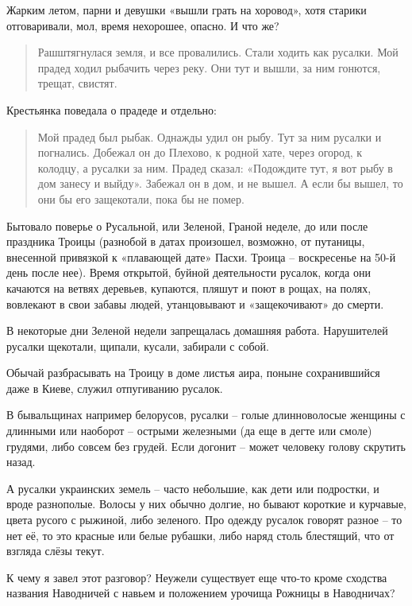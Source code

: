 Жарким летом, парни и девушки «вышли грать на хоровод», хотя старики отговаривали, мол, время нехорошее, опасно. И что же? 

\begin{quotation} 
Рашштягнулася земля, и все провалились. Стали ходить как русалки. Мой прадед ходил рыбачить через реку. Они тут и вышли, за ним гонются, трещат, свистят.
\end{quotation} 

Крестьянка поведала о прадеде и отдельно:

\begin{quotation} 
Мой прадед был рыбак. Однажды удил он рыбу. Тут за ним русалки и погнались. Добежал он до Плехово, к родной хате, через огород, к колодцу, а русалки за ним. Прадед сказал: «Подождите тут, я вот рыбу в дом занесу и выйду». Забежал он в дом, и не вышел. А если бы вышел, то они бы его защекотали, пока бы не помер.
\end{quotation} 

Бытовало поверье о Русальной, или Зеленой, Граной неделе, до или после праздника Троицы (разнобой в датах произошел, возможно, от путаницы, внесенной привязкой к «плавающей дате» Пасхи. Троица – воскресенье на 50-й день после нее). Время открытой, буйной деятельности русалок, когда они качаются на ветвях деревьев, купаются, пляшут и поют в рощах, на полях, вовлекают в свои забавы людей, утанцовывают и «защекочивают» до смерти.

В некоторые дни Зеленой недели запрещалась домашняя работа. Нарушителей русалки щекотали, щипали, кусали, забирали с собой.

Обычай разбрасывать на Троицу в доме листья аира, поныне сохранившийся даже в Киеве, служил отпугиванию русалок. 

В бывальщинах например белорусов, русалки – голые длинноволосые женщины с длинными или наоборот – острыми железными (да еще в дегте или смоле) грудями, либо совсем без грудей. Если догонит – может человеку голову скрутить назад. 

А русалки украинских земель – часто небольшие, как дети или подростки, и вроде разнополые. Волосы у них обычно долгие, но бывают короткие и курчавые, цвета русого с рыжиной, либо зеленого. Про одежду русалок говорят разное – то нет её, то это красные или белые рубашки, либо наряд столь блестящий, что от взгляда слёзы текут.

К чему я завел этот разговор? Неужели существует еще что-то кроме сходства названия Наводничей с навьем и положением урочища Рожницы в Наводничах?

